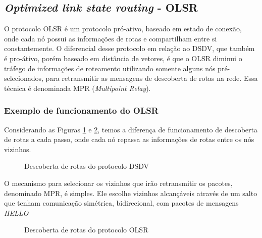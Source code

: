 \subsection{\textit{Optimized link state routing} - OLSR}
O protocolo OLSR \cite{rfc3626} \'e um protocolo pr\'o-ativo, baseado em estado de conex\~ao, onde cada n\'o possui as informa\c{c}\~oes de rotas e compartilham entre si constantemente. 
O diferencial desse protocolo em rela\c{c}\~ao ao DSDV, que tamb\'em \'e pro-\'ativo, por\'em baseado em dist\^ancia de vetores, \'e que o OLSR diminui o tr\'afego de informa\c{c}\~oes de roteamento utilizando somente alguns n\'os pr\'e-selecionados, para retransmitir as mensagens de descoberta de rotas na rede.
Essa t\'ecnica \'e denominada MPR (\textit{Multipoint Relay}).

\subsubsection{Exemplo de funcionamento do OLSR}
Considerando as Figuras \ref{fig:olsrComum} e \ref{fig:olsrOperation}, temos a diferen\c{c}a de funcionamento de descoberta de rotas a cada passo, onde cada n\'o repassa as informa\c{c}\~oes de rotas entre os n\'os vizinhos.

\begin{figure}[H]
	\centering
	\label{subfig:olsrStep11}
	\label{subfig:olsrStep12}
	\label{subfig:olsrStep13}
	\label{subfig:olsrStep14}	
	\caption{Descoberta de rotas do protocolo DSDV}
	\label{fig:olsrComum}
\end{figure}

O mecanismo para selecionar os vizinhos que ir\~ao retransmitir os pacotes, denominado MPR, \'e simples. Ele escolhe vizinhos alcan\c{c}\'aveis atrav\'es de um salto que tenham comunica\c{c}\~ao sim\'etrica, bidirecional, com pacotes de mensagens \textit{HELLO}

\begin{figure}[H]
	\centering
	\label{subfig:olsrStep21}
	\label{subfig:olsrStep22}
	\label{subfig:olsrStep23}
	\label{subfig:olsrStep24}	
	\caption{Descoberta de rotas do protocolo OLSR}
	\label{fig:olsrOperation}
\end{figure}


